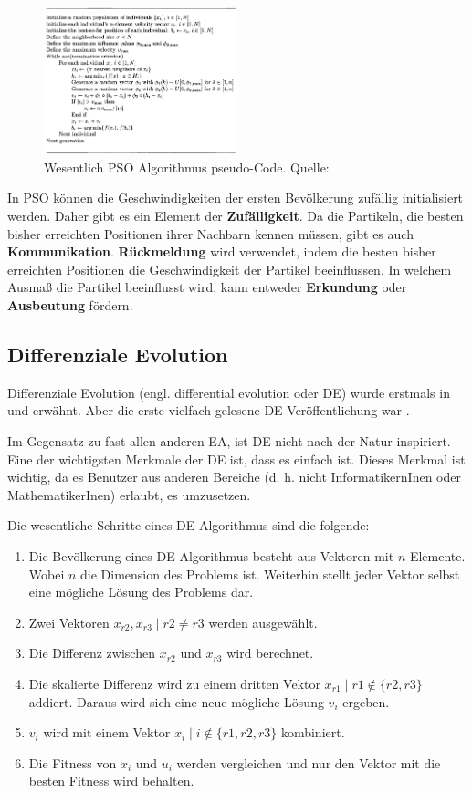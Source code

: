 \documentclass[twoside,twocolumn]{article}
\begin{document}
\begin{figure}
\caption{Wesentlich PSO Algorithmus pseudo-Code. Quelle: \cite[p.~268]{wiley_evolutionary}}
\label{fig:pso_pseudo}
\centering
\includegraphics[width=0.5\textwidth]{images/pso_pseudo.png}
\end{figure}

In PSO können die Geschwindigkeiten der ersten Bevölkerung zufällig initialisiert werden. Daher gibt es ein Element der \textbf{Zufälligkeit}. Da die Partikeln, die besten bisher erreichten Positionen ihrer Nachbarn kennen müssen, gibt es auch \textbf{Kommunikation}. \textbf{Rückmeldung} wird verwendet, indem die besten bisher erreichten Positionen die Geschwindigkeit der Partikel beeinflussen. In welchem Ausmaß die Partikel beeinflusst wird, kann entweder \textbf{Erkundung} oder \textbf{Ausbeutung} fördern.

\subsection{Differenziale Evolution}
Differenziale Evolution (engl. differential evolution oder DE) wurde erstmals in \cite{storn_de_a} und \cite{storn_de_b} erwähnt. Aber die erste vielfach gelesene DE-Veröffentlichung war \cite{price_storn_de}.\par
Im Gegensatz zu fast allen anderen EA, ist DE nicht nach der Natur inspiriert. Eine der wichtigsten Merkmale der DE ist, dass es einfach ist. Dieses Merkmal ist wichtig, da es Benutzer aus anderen Bereiche (d. h. nicht InformatikernInen oder MathematikerInen) erlaubt, es umzusetzen.\par
Die wesentliche Schritte eines DE Algorithmus sind die folgende:

\begin{enumerate}
\item Die Bevölkerung eines DE Algorithmus besteht aus Vektoren mit $n$ Elemente. Wobei $n$ die Dimension des Problems ist. Weiterhin stellt jeder Vektor selbst eine mögliche Lösung des Problems dar.
\item Zwei Vektoren $x_{r2}, x_{r3} \mid r2 \neq r3$ werden ausgewählt.
\item Die Differenz zwischen $x_{r2}$ und $x_{r3}$ wird berechnet.
\item Die skalierte Differenz wird zu einem dritten Vektor $x_{r1} \mid r1 \notin \{ r2, r3 \}$ addiert. Daraus wird sich eine neue mögliche Lösung $v_i$ ergeben.
\item $v_i$ wird mit einem Vektor $x_i \mid i \notin \{ r1, r2, r3 \}$ kombiniert.
\item Die Fitness von $x_i$ und $u_i$ werden vergleichen und nur den Vektor mit die besten Fitness wird behalten.
\end{enumerate}
\end{document}
